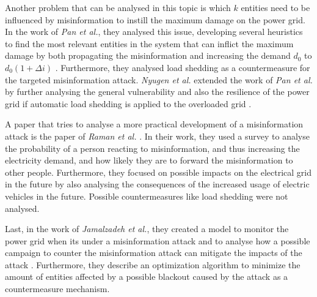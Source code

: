 Another problem that can be analysed in this topic is which $k$ entities 
need to be influenced by misinformation to instill 
the maximum damage on the power grid. In the work of \textit{Pan et al.}, 
they analysed this issue, developing several heuristics to find the most 
relevant entities in the system that can inflict the maximum damage by both 
propagating the misinformation and increasing the demand 
$d_0$ to $d_0(1+\Delta i)$ \cite{pan2017threat}. 
Furthermore, they analysed load shedding as a
countermeasure for the targeted misinformation attack.
\textit{Nyugen et al.} extended the work of \textit{Pan et al.}
by further analysing the general vulnerability and also the resilience of 
the power grid if automatic load shedding is applied to the overloaded grid
\cite{nguyen2019vulnerability}.

A paper that tries to analyse a more practical development of a misinformation
attack is the paper of \textit{Raman et al.} \cite{raman2020weaponizing}.
In their work, they used a survey to analyse the probability of a person
reacting to misinformation, and thus increasing the electricity demand,
and how likely they are to forward the misinformation to other people.
Furthermore, they focused on possible impacts on the electrical grid in 
the future by also analysing the consequences of the increased 
usage of electric vehicles in the future. Possible countermeasures like
load shedding were not analysed.

Last, in the work of \textit{Jamalzadeh et al.}, they created a model to monitor
the power grid when its under a misinformation attack and to analyse
how a possible campaign to counter the misinformation attack can mitigate
the impacts of the attack \cite{jamalzadeh2022protecting}. Furthermore,
they describe an optimization algorithm to minimize the amount of 
entities affected by a possible blackout caused by the attack as 
a countermeasure mechanism.